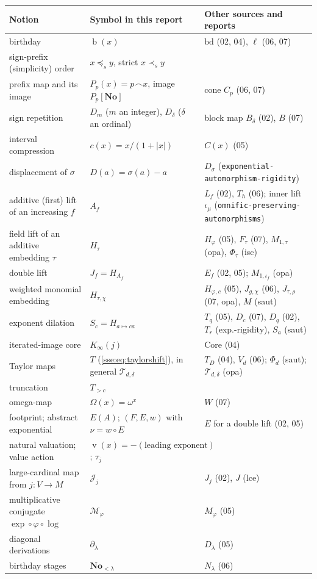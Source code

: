 \documentclass[11pt,a4paper]{article}
\numberwithin{equation}{section}
\theoremstyle{plain}
\theoremstyle{definition}
\theoremstyle{remark}
\newcommand{\No}{\mathbf{No}}
\newcommand{\bday}{\operatorname{b}}
\newcommand{\pref}{\preccurlyeq_s}
\newcommand{\spref}{\prec_s}
\newcommand{\concat}{\mathbin{\frown}}
\newcommand{\val}{\operatorname{v}}
\newcommand{\fn}[1]{\nolinkurl{#1}}%
\begin{document}
\begin{longtable}{P{44mm}P{45mm}P{60mm}}
\toprule
Notion & Symbol in this report & Other sources and reports \\
\midrule
\endhead
birthday & $\bday(x)$ & $\mathrm{bd}$ (02, 04), $\ell$ (06, 07) \\
sign-prefix (simplicity) order & $x\pref y$, strict $x\spref y$ & \\
prefix map and its image & $P_p(x)=p\concat x$, image $P_p[\No]$ & cone $C_p$ (06, 07) \\
sign repetition & $D_m$ ($m$ an integer), $D_\delta$ ($\delta$ an ordinal) & block map $B_\delta$ (02), $B$ (07) \\
interval compression & $c(x)=x/(1+|x|)$ & $C(x)$ (05) \\
displacement of $\sigma$ & $D(a)=\sigma(a)-a$ & $D_\sigma$ (\fn{exponential-automorphism-rigidity}) \\
additive (first) lift of an increasing $f$ & $A_f$ & $L_f$ (02), $T_h$ (06); inner lift $\iota_\mu$ (\fn{omnific-preserving-automorphisms}) \\
field lift of an additive embedding $\tau$ & $H_\tau$ & $H_\varphi$ (05), $F_\tau$ (07), $M_{1,\tau}$ (opa), $\Phi_\tau$ (isc) \\
double lift & $J_f=H_{A_f}$ & $E_f$ (02, 05); $M_{1,\iota_f}$ (opa) \\
weighted monomial embedding & $H_{\tau,\chi}$ & $H_{\varphi,c}$ (05), $J_{g,\chi}$ (06), $J_{\tau,\rho}$ (07, opa), $M$ (saut) \\
exponent dilation & $S_c=H_{a\mapsto ca}$ & $T_q$ (05), $D_c$ (07), $D_q$ (02), $T_r$ (exp.-rigidity), $S_a$ (saut) \\
iterated-image core & $K_\infty(j)$ & $\mathrm{Core}$ (04) \\
Taylor maps & $T$ (\cref{sse:eq:taylorshift}), in general $\mathcal T_{d,\delta}$ & $T_D$ (04), $V_d$ (06); $\Phi_d$ (saut); $\mathcal T_{d,\delta}$ (opa) \\
truncation & $T_{>c}$ & \\
omega-map & $\Omega(x)=\omega^x$ & $W$ (07) \\
footprint; abstract exponential & $E(A)$; $(F,E,w)$ with $\nu=w\circ E$ & $E$ for a double lift (02, 05) \\
natural valuation; value action & $\val(x)=-(\text{leading exponent})$; $\tau_j$ & \\
large-cardinal map from $j:V\to M$ & $\mathcal J_j$ & $J_j$ (02), $J$ (lce) \\
multiplicative conjugate $\exp\circ\varphi\circ\log$ & $\mathcal M_\varphi$ & $M_\varphi$ (05) \\
diagonal derivations & $\partial_\lambda$ & $D_\lambda$ (05) \\
birthday stages & $\No_{<\lambda}$ & $N_\lambda$ (06) \\
\bottomrule
\end{longtable}
\end{document}
